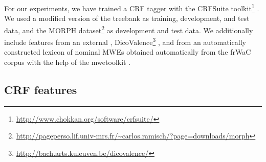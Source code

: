 \documentclass[output=paper,
modfonts
]{langscibook}
\begin{document}
For our experiments, we have trained a CRF tagger with the CRFSuite toolkit\footnote{\url{http://www.chokkan.org/software/crfsuite/}} \citep{CRFsuite}. We used a modified version of the  treebank \citep{abeille:2003:ftb} as training, development, and test data, and the MORPH dataset\footnote{\url{http://pageperso.lif.univ-mrs.fr/~carlos.ramisch/?page=downloads/morph}} \citep{nasr:acl:2015} as development and test data. We additionally include features from an external , DicoValence\footnote{\url{http://bach.arts.kuleuven.be/dicovalence/}} \citep{dicovalence}, and from an automatically constructed lexicon of nominal MWEs obtained automatically from the frWaC corpus \citep{wacky:2006} with the help of the mwetoolkit \citep{ramisch2014multiword}. 


\subsection{CRF features}
\label{subsec:crf-feat}
\end{document}
